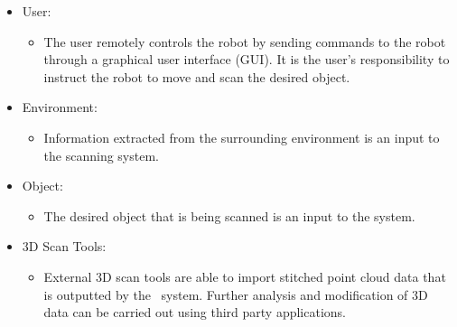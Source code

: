 \documentclass[12pt]{article}
\begin{document}

\begin{itemize}
\item User:
\begin{itemize}
\item The user remotely controls the robot by sending commands to the robot through a graphical user interface (GUI). It is the user's responsibility to instruct the robot to move and scan the desired object. 
\end{itemize}
\end{itemize}

\begin{itemize}
\item Environment:
\begin{itemize}
\item Information extracted from the surrounding environment is an input to the scanning system.
\end{itemize}
\end{itemize}

\begin{itemize}
\item Object:
\begin{itemize}
\item The desired object that is being scanned is an input to the system.
\end{itemize}
\end{itemize}

\begin{itemize}
\item 3D Scan Tools:
\begin{itemize}
\item External 3D scan tools are able to import stitched point cloud data that is outputted by the \progname\ system. Further analysis and modification of 3D data can be carried out using third party applications.
\end{itemize}
\end{itemize}
\end{document}
